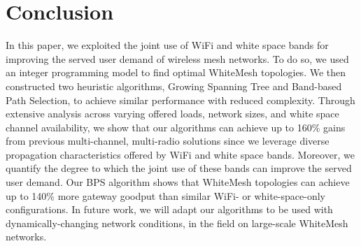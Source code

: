 \section{Conclusion}
\label{sec:conclusion}
In this paper, we exploited the joint use of WiFi and white space bands for 
improving the served user demand of wireless mesh networks.  To do so, we
used an integer programming model to find optimal WhiteMesh topologies.  We
then constructed two heuristic algorithms, Growing Spanning Tree and Band-based
Path Selection, to achieve similar performance with reduced complexity. Through 
extensive analysis across varying offered loads, network sizes, and white space 
channel availability, we show that our algorithms can achieve up to 160\% gains 
from previous multi-channel, multi-radio solutions since we leverage diverse 
propagation characteristics offered by WiFi and white space bands.  Moreover,
we quantify the degree to which the joint use of these bands can improve the served
user demand. Our BPS algorithm shows that WhiteMesh topologies can achieve up to 
140\% more gateway goodput than similar WiFi- or white-space-only configurations.
In future work, we will adapt our algorithms to be used with dynamically-changing
network conditions, in the field on large-scale WhiteMesh networks.


